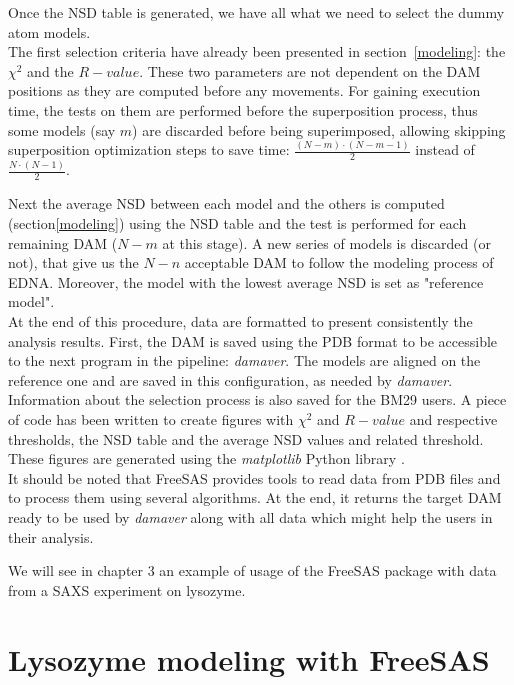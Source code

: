 \documentclass[a4paper, 11pt]{report}
\begin{document}
Once the NSD table is generated, we have all what we need to select 
the dummy atom models.\\
The first selection criteria have already been presented in 
section~\ref{modeling}: the $\chi^2$ and the $R-value$. 
These two parameters are not dependent on the DAM positions as they 
are computed before any movements. 
For gaining execution time, the tests on them are performed before 
the superposition process, thus some models (say $m$) are discarded 
before being superimposed, allowing skipping superposition 
optimization steps to save time: $\frac{(N-m) \cdot (N-m-1)}{2}$ 
instead of $\frac{N \cdot (N-1)}{2}$.

Next the average NSD between each model and the others is computed 
(section\ref{modeling}) using the NSD table and the test is performed 
for each remaining DAM ($N-m$ at this stage). 
A new series of models is discarded (or not), that give us the 
$N-n$ acceptable DAM to follow the modeling process of EDNA. 
Moreover, the model with the lowest average NSD is set as "reference 
model".\\

At the end of this procedure, data are formatted to present 
consistently the analysis results. 
First, the DAM is saved using the PDB format to be accessible to 
the next program in the pipeline: \textit{damaver}. 
The models are aligned on the reference one and are saved in this 
configuration, as needed by \textit{damaver}. 
Information about the selection process is also saved for the BM29 
users. 
A piece of code has been written to create figures with $\chi^2$ and 
$R-value$ and respective thresholds, the NSD table and the average NSD 
values and related threshold. 
These figures are generated using the \textit{matplotlib} Python 
library \cite{matplotlib}.\\

It should be noted that FreeSAS provides tools to read data from PDB 
files and to process them using several algorithms. 
At the end, it returns the target DAM ready to be used by 
\textit{damaver} along with all data which might help the users in 
their analysis.

We will see in chapter 3 an example of usage of the FreeSAS package 
with data from a SAXS experiment on lysozyme.


\chapter{Lysozyme modeling with FreeSAS}%
\end{document}
